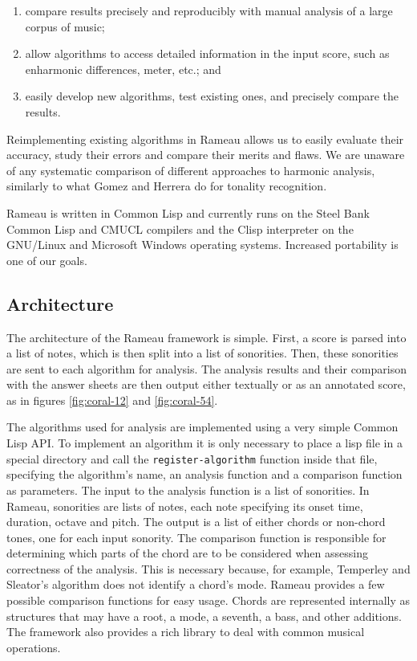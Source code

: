 \documentclass{article}
\begin{document}
\begin{enumerate}
\item compare results precisely and reproducibly with manual analysis
  of a large corpus of music;
\item allow algorithms to access detailed information in the input score,
  such as enharmonic differences, meter, etc.; and
\item easily develop new algorithms, test existing ones, and precisely
  compare the results.
\end{enumerate}

Reimplementing existing algorithms in Rameau allows us to easily
evaluate their accuracy, study their errors and compare their merits
and flaws. We are unaware of any systematic comparison of different
approaches to harmonic analysis, similarly to what Gomez and Herrera
\cite{gomez.ea:song} do for tonality recognition.

Rameau is written in Common Lisp and currently runs on the Steel Bank
Common Lisp \cite{team:sbcl} and CMUCL \cite{maclachlan:cmucl}
compilers and the Clisp \cite{haible.ea:clisp} interpreter on the
GNU/Linux and Microsoft Windows operating systems. Increased
portability is one of our goals.

\subsection{Architecture}
\label{sec:architecture-and-api}

The architecture of the Rameau framework is simple. First, a score is
parsed into a list of notes, which is then split into a list of
sonorities. Then, these sonorities are sent to each algorithm for
analysis. The analysis results and their comparison with the answer
sheets are then output either textually or as an annotated score, as
in figures \ref{fig:coral-12} and \ref{fig:coral-54}.

The algorithms used for analysis are implemented using a very simple
Common Lisp API. To implement an algorithm it is only necessary to
place a lisp file in a special directory and call the
\texttt{register-algorithm} function inside that file, specifying the
algorithm's name, an analysis function and a comparison function as
parameters. The input to the analysis function is a list of
sonorities. In Rameau, sonorities are lists of notes, each note
specifying its onset time, duration, octave and pitch. The output is a
list of either chords or non-chord tones, one for each input
sonority. The comparison function is responsible for determining which
parts of the chord are to be considered when assessing correctness of
the analysis. This is necessary because, for example, Temperley and
Sleator's\cite{temperley.ea:modeling} algorithm does not identify a
chord's mode. Rameau provides a few possible comparison functions for
easy usage. Chords are represented internally as structures that may
have a root, a mode, a seventh, a bass, and other additions. The
framework also provides a rich library to deal with common musical
operations.
\end{document}
